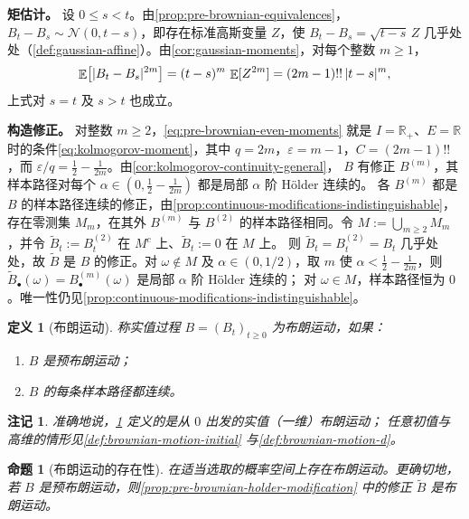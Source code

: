\documentclass[UTF8,11pt,a4paper,oneside,fontset=fandol]{ctexrep}
\makeatletter
\numberwithin{equation}{section}
\theoremstyle{zhthm}
\newtheorem{proposition}[theorem]{命题}
\newtheorem{definition}[theorem]{定义}
\newtheorem{remark}[theorem]{注记}
\renewenvironment{proof}[1][\proofname]{\par
  \pushQED{\qed}%
  \normalfont\topsep6\p@\@plus6\p@\relax
  \trivlist
  \item[\hskip\labelsep\bfseries#1\hspace{0.5em}]\ignorespaces
}{%
  \popQED\endtrivlist\@endpefalse
}
\renewcommand{\proofname}{证明}
\newcommand{\R}{\mathbb{R}}
\DeclareMathOperator{\E}{\mathbb{E}}
\newcommand{\Normal}{\mathcal{N}}
\DeclarePairedDelimiter{\abs}{\lvert}{\rvert}
\makeatother
\begin{document}
\begin{proof}
\textbf{矩估计。}
设 $0\le s<t$。由\cref{prop:pre-brownian-equivalences}，$B_t-B_s\sim\Normal(0,t-s)$，即存在标准高斯变量 $Z$，使
$B_t-B_s=\sqrt{t-s}\,Z$ 几乎处处（\cref{def:gaussian-affine}）。由\cref{cor:gaussian-moments}，对每个整数 $m\ge1$，
\begin{equation}
  \label{eq:pre-brownian-even-moments}
  \E\bigl[\abs{B_t-B_s}^{2m}\bigr]=(t-s)^m\,\E[Z^{2m}]=(2m-1)!!\,\abs{t-s}^m,
\end{equation}
上式对 $s=t$ 及 $s>t$ 也成立。

\textbf{构造修正。}
对整数 $m\ge2$，\cref{eq:pre-brownian-even-moments} 就是 $I=\R_+$、$E=\R$ 时的条件\cref{eq:kolmogorov-moment}，其中
$q=2m$，$\varepsilon=m-1$，$C=(2m-1)!!$，而 $\varepsilon/q=\tfrac12-\tfrac1{2m}$。由\cref{cor:kolmogorov-continuity-general}，
$B$ 有修正 $B^{(m)}$，其样本路径对每个 $\alpha\in(0,\tfrac12-\tfrac1{2m})$ 都是局部 $\alpha$ 阶 Hölder 连续的。
各 $B^{(m)}$ 都是 $B$ 的样本路径连续的修正，由\cref{prop:continuous-modifications-indistinguishable}，存在零测集 $M_m$，在其外 $B^{(m)}$ 与 $B^{(2)}$
的样本路径相同。令 $M:=\bigcup_{m\ge2}M_m$，并令 $\widetilde B_t:=B^{(2)}_t$ 在 $M^c$ 上、$\widetilde B_t:=0$ 在 $M$ 上。
则 $\widetilde B_t=B^{(2)}_t=B_t$ 几乎处处，故 $\widetilde B$ 是 $B$ 的修正。对 $\omega\notin M$ 及 $\alpha\in(0,1/2)$，取 $m$
使 $\alpha<\tfrac12-\tfrac1{2m}$，则 $\widetilde B_\bullet(\omega)=B^{(m)}_\bullet(\omega)$ 是局部 $\alpha$ 阶 Hölder 连续的；
对 $\omega\in M$，样本路径恒为 $0$。唯一性仍见\cref{prop:continuous-modifications-indistinguishable}。
\end{proof}

\begin{definition}[布朗运动]
\label{def:brownian-motion}
称实值过程 $B=(B_t)_{t\ge0}$ 为布朗运动，如果：
\begin{enumerate}
  \item $B$ 是预布朗运动；
  \item $B$ 的每条样本路径都连续。
\end{enumerate}
\end{definition}

\begin{remark}
\label{rem:brownian-motion-scope}
准确地说，\cref{def:brownian-motion} 定义的是从 $0$ 出发的实值（一维）布朗运动；
任意初值与高维的情形见\cref{def:brownian-motion-initial} 与\cref{def:brownian-motion-d}。
\end{remark}

\begin{proposition}[布朗运动的存在性]
\label{prop:brownian-motion-existence}
在适当选取的概率空间上存在布朗运动。更确切地，若 $B$ 是预布朗运动，则\cref{prop:pre-brownian-holder-modification}
中的修正 $\widetilde B$ 是布朗运动。
\end{proposition}
\end{document}
